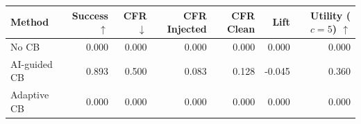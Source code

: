 \begin{tabular}{lrrrrrr}
\toprule
Method & Success $\uparrow$ & CFR $\downarrow$ & CFR Injected & CFR Clean & Lift & Utility ($c=5$) $\uparrow$ \\
\midrule
No CB & 0.000 & 0.000 & 0.000 & 0.000 & 0.000 & 0.000 \\
AI-guided CB & 0.893 & 0.500 & 0.083 & 0.128 & -0.045 & 0.360 \\
Adaptive CB & 0.000 & 0.000 & 0.000 & 0.000 & 0.000 & 0.000 \\
\bottomrule
\end{tabular}
